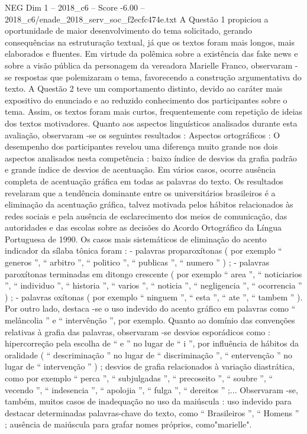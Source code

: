 \begin{textsample}{NEG Dim 1 – 2018\_c6 – Score -6.00 – 2018\_c6/enade\_2018\_serv\_soc\_f2ecfc474e.txt}
A Questão 1 propiciou a oportunidade de maior desenvolvimento do tema solicitado, gerando consequências na estruturação textual, já que os textos foram mais longos, mais elaborados e fluentes.
Em virtude da polêmica sobre a existência das fake news e sobre a visão pública da personagem da vereadora Marielle Franco, observaram -se respostas que polemizaram o tema, favorecendo a construção argumentativa do texto.
A Questão 2 teve um comportamento distinto, devido ao caráter mais expositivo do enunciado e ao reduzido conhecimento dos participantes sobre o tema.
Assim, os textos foram mais curtos, frequentemente com repetição de ideias dos textos motivadores.
Quanto aos aspectos linguísticos analisados durante esta avaliação, observaram -se os seguintes resultados : Aspectos ortográficos : O desempenho dos participantes revelou uma diferença muito grande nos dois aspectos analisados nesta competência : baixo índice de desvios da grafia padrão e grande índice de desvios de acentuação.
Em vários casos, ocorre ausência completa de acentuação gráfica em todas as palavras do texto.
Os resultados revelaram que a tendência dominante entre os universitários brasileiros é a eliminação da acentuação gráfica, talvez motivada pelos hábitos relacionados às redes sociais e pela ausência de esclarecimento dos meios de comunicação, das autoridades e das escolas sobre as decisões do Acordo Ortográfico da Língua Portuguesa de 1990.
Os casos mais sistemáticos de eliminação do acento indicador da sílaba tônica foram : - palavras proparoxítonas ( por exemplo “ generos ”, “ arbitro ”, “ politico ”, “ publicas ”, “ numero ” ) ; - palavras paroxítonas terminadas em ditongo crescente ( por exemplo “ area ”, “ noticiarios ”, “ individuo ”, “ historia ”, “ varios ”, “ noticia ”, “ negligencia ”, “ ocorrencia ” ) ; - palavras oxítonas ( por exemplo “ ninguem ”, “ esta ”, “ ate ”, “ tambem ” ).
Por outro lado, destaca -se o uso indevido do acento gráfico em palavras como “ melâncolia ” e “ intervênção ”, por exemplo.
Quanto ao domínio das convenções relativas à grafia das palavras, observaram -se desvios esporádicos como : hipercorreção pela escolha de “ e ” no lugar de “ i ”, por influência de hábitos da oralidade ( “ descriminação ” no lugar de “ discriminação ”, “ entervenção ” no lugar de “ intervenção ” ) ; desvios de grafia relacionados à variação diastrática, como por exemplo “ perca ”, “ subjulgadas ”, “ precoseito ”, “ soubre ”, “ vecendo ”, “ indesencia ”, “ apolojia ”, “ fulga ”, “ dereitos ” ;...
Observaram -se, também, muitos casos de inadequação no uso da maiúscula : uso indevido para destacar determinadas palavras-chave do texto, como “ Brasileiros ”, “ Homens ” ; ausência de maiúscula para grafar nomes próprios, como"marielle".

\end{textsample}
